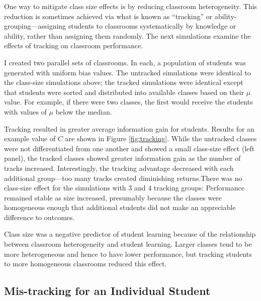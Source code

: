 \documentclass[10pt,letterpaper]{article}
\begin{document}
One way to mitigate class size effects is by reducing classroom heterogeneity. This reduction is sometimes achieved via what is known as ``tracking'' or ability-grouping---assigning students to classrooms systematically by knowledge or ability, rather than assigning them randomly. The next simulations examine the effects of tracking on classroom performance. 

I created two parallel sets of classrooms. In each, a population of students was generated with uniform bias values. The untracked simulations were identical to the class-size simulations above; the tracked simulations were identical except that students were sorted and distributed into available classes based on their $\mu$ value. For example, if there were two classes, the first would receive the students with values of $\mu$ below the median. 

Tracking resulted in greater average information gain for students. Results for an example value of $C$ are shown in Figure \ref{fig:tracking}. While the untracked classes were not differentiated from one another and showed a small class-size effect (left panel), the tracked classes showed greater information gain as the number of tracks increased. Interestingly, the tracking advantage decreased with each additional group---too many tracks created diminishing returns.There was no class-size effect for the simulations with 3 and 4 tracking groups: Performance remained stable as size increased, presumably because the classes were homogeneous enough that additional students did not make an appreciable difference to outcomes.  

Class size was a negative predictor of student learning because of the relationship between classroom heterogeneity and student learning. Larger classes tend to be more heterogeneous and hence to have lower performance, but tracking students to more homogeneous classrooms reduced this effect.

\subsection{Mis-tracking for an Individual Student}
\end{document}
